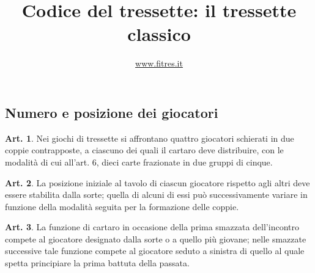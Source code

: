 \documentclass[italian,a4paper]{article}
\title{Codice del tressette: il tressette classico}
\author{\url{www.fitres.it}}
\date{}
\theoremstyle{definition}
\newtheorem{art}{Art.}
\begin{document}
\maketitle
\subsection{Numero e posizione dei giocatori}
\begin{art}
Nei giochi di tressette si affrontano quattro giocatori schierati in due coppie contrapposte, a ciascuno dei quali il cartaro deve distribuire, con le modalità di cui all'art. 6, dieci carte frazionate in due gruppi di cinque.
\end{art}
\begin{art}
La posizione iniziale al tavolo di ciascun giocatore rispetto agli altri deve essere stabilita dalla sorte; quella di alcuni di essi può successivamente variare in funzione della modalità seguita per la formazione delle coppie.
\end{art}
\begin{art}
La funzione di cartaro in occasione della prima smazzata dell'incontro compete al giocatore designato dalla sorte o a quello più giovane; nelle smazzate successive tale funzione compete al giocatore seduto a sinistra di quello al quale spetta principiare la prima battuta della passata.
\end{art}
\end{document}
